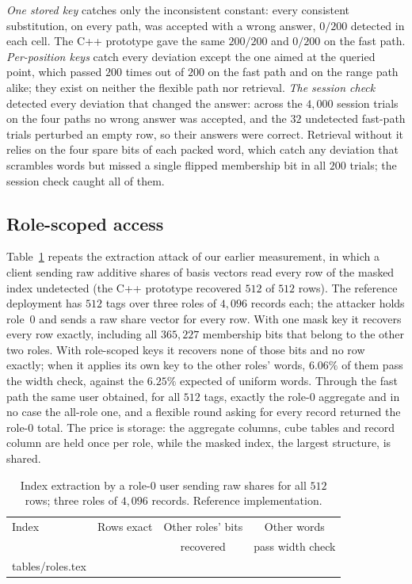 \documentclass[a4paper,fleqn]{cas-sc}
\begin{document}
\emph{One stored key} catches only the inconsistent constant: every consistent
substitution, on every path, was accepted with a wrong answer, $0/200$ detected
in each cell. The C++ prototype gave the same $200/200$ and $0/200$ on the fast
path. \emph{Per-position keys} catch every deviation except the one aimed at
the queried point, which passed $200$ times out of $200$ on the fast path and
on the range path alike; they exist on neither the flexible path nor
retrieval. \emph{The session check} detected every deviation that changed the
answer: across the $4{,}000$ session trials on the four paths no wrong answer
was accepted, and the $32$ undetected fast-path trials perturbed an empty row,
so their answers were correct. Retrieval without it relies on the four spare
bits of each packed word, which catch any deviation that scrambles words but
missed a single flipped membership bit in all $200$ trials; the session check
caught all of them.

\subsection{Role-scoped access}
\label{sec:authresult}
Table~\ref{tab:roles} repeats the extraction attack of our earlier
measurement, in which a client sending raw additive shares of basis vectors
read every row of the masked index undetected (the C++ prototype recovered
$512$ of $512$ rows). The reference deployment has $512$ tags over three roles
of $4{,}096$ records each; the attacker holds role~$0$ and sends a raw share
vector for every row. With one mask key it recovers every row exactly, including
all $365{,}227$ membership bits that belong to the other two roles. With
role-scoped keys it recovers none of those bits and no row exactly; when it
applies its own key to the other roles' words, $6.06\%$ of them pass the width
check, against the $6.25\%$ expected of uniform words. Through the fast path the
same user obtained, for all $512$ tags, exactly the role-$0$ aggregate and in no
case the all-role one, and a flexible round asking for every record returned
the role-$0$ total. The price is storage: the aggregate columns, cube tables and
record column are held once per role, while the masked index, the largest
structure, is shared.

\begin{table}[pos=htbp]
\caption{Index extraction by a role-$0$ user sending raw shares for all
$512$ rows; three roles of $4{,}096$ records. Reference implementation.}
\label{tab:roles}
\centering
\footnotesize
\begin{tabular*}{\tblwidth}{@{\extracolsep{\fill}}lccc@{}}
\toprule
Index & Rows exact & Other roles' bits & Other words \\
 & & recovered & pass width check \\
\midrule
{} tables/roles.tex 
\bottomrule
\end{tabular*}
\end{table}
\end{document}
